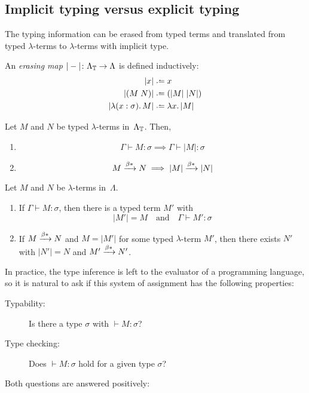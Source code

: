 \subsection{Implicit typing versus explicit typing}
The typing information can be erased from typed terms and translated
from typed $\lambda$-terms to $\lambda$-terms with implicit type.
\begin{definition}
  An \emph{erasing map} $|-|\colon \Lambda_{\mathbb{T}} \to \Lambda$ is defined
  inductively:
  \begin{align*}
    |x| & \defeq x \\
    |(M\; N)| & \defeq (|M|\;|N|) \\
    |\lambda (x:\sigma).\, M| & \defeq \lambda x.\, |M|
  \end{align*}
\end{definition}
\begin{proposition}
  Let $M$ and $N$ be typed $\lambda$-terms in~$\Lambda_{\mathbb{T}}$. Then,
  \begin{enumerate}
    \item 
      \[
        \Gamma \vdash M : \sigma \implies
        \Gamma \vdash |M| : \sigma
      \]
    \item 
      \[
        M \xrightarrow{\beta*} N 
        \implies
        |M| \xrightarrow{\beta*} |N|
      \]
  \end{enumerate}
\end{proposition}
\begin{proposition}
  Let $M$ and $N$ be $\lambda$-terms in~$\Lambda$. 
  \begin{enumerate}
    \item If $\Gamma \vdash M : \sigma$, then there is a typed term $M'$ with 
      \[
        |M'| = M
        \quad\text{and}\quad
        \Gamma \vdash M' : \sigma
      \]
    \item If $M \xrightarrow{\beta*} N$ and $M = |M'|$ for some typed $\lambda$-term $M'$,
      then there exists $N'$ with $|N'| = N$ and $M' \xrightarrow{\beta*} N'$.
    \end{enumerate}
\end{proposition}

In practice, the type inference is left to the evaluator of a programming
language, so it is natural to ask if this system of assignment has the following
properties:
\begin{description}
  \item[Typability:] Is there a type $\sigma$ with $\vdash M : \sigma$? 
  \item[Type checking:] Does $\vdash M : \sigma$ hold for a given type $\sigma$?
  \end{description}
Both questions are answered positively:

